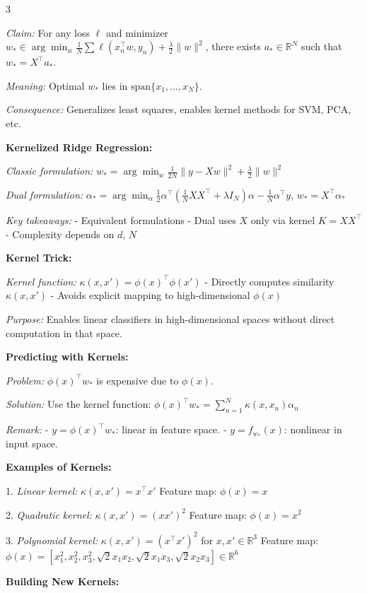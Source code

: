 \documentclass[landscape, 10pt]{article}
\begin{document}
\begin{multicols*}{3}
{\textit{Claim:} For any loss $\ell$ and minimizer  
$w_* \in \arg\min_w \frac{1}{N} \sum \ell(x_n^\top w, y_n) + \frac{\lambda}{2} \|w\|^2$,  
there exists $a_* \in \mathbb{R}^N$ such that $w_* = X^\top a_*$.

\textit{Meaning:} Optimal $w_*$ lies in $\text{span}\{x_1, \dots, x_N\}$.

\textit{Consequence:} Generalizes least squares, enables kernel methods for SVM, PCA, etc.
\item \textbf{Kernelized Ridge Regression:}

\textit{Classic formulation:}  
$w_* = \arg\min_w \frac{1}{2N} \|y - Xw\|^2 + \frac{\lambda}{2} \|w\|^2$

\textit{Dual formulation:}  
$\alpha_* = \arg\min_\alpha \frac{1}{2} \alpha^\top (\frac{1}{N} XX^\top + \lambda I_N) \alpha - \frac{1}{N} \alpha^\top y$,  
$w_* = X^\top \alpha_*$

\textit{Key takeaways:}  
- Equivalent formulations  
- Dual uses $X$ only via kernel $K = XX^\top$
- Complexity depends on $d$, $N$  

\item \textbf{Kernel Trick:}

\textit{Kernel function:} $\kappa(x, x') = \phi(x)^\top \phi(x')$  
- Directly computes similarity $\kappa(x, x')$  
- Avoids explicit mapping to high-dimensional $\phi(x)$  

\textit{Purpose:} Enables linear classifiers in high-dimensional spaces without direct computation in that space.  

\item \textbf{Predicting with Kernels:}

\textit{Problem:} $\phi(x)^\top w_*$ is expensive due to $\phi(x)$.  

\textit{Solution:} Use the kernel function:  
$\phi(x)^\top w_* = \sum_{n=1}^N \kappa(x, x_n) \alpha_n$  

\textit{Remark:}  
- $y = \phi(x)^\top w_*$: linear in feature space.  
- $y = f_{w_*}(x)$: nonlinear in input space.  

\item \textbf{Examples of Kernels:}

1. \textit{Linear kernel:} $\kappa(x, x') = x^\top x'$  
   Feature map: $\phi(x) = x$  

2. \textit{Quadratic kernel:} $\kappa(x, x') = (x x')^2$  
   Feature map: $\phi(x) = x^2$  

3. \textit{Polynomial kernel:} $\kappa(x, x') = (x^\top x')^2$ for $x, x' \in \mathbb{R}^3$  
   Feature map:  
   $\phi(x) = [x_1^2, x_2^2, x_3^2, \sqrt{2}x_1x_2, \sqrt{2}x_1x_3, \sqrt{2}x_2x_3] \in \mathbb{R}^6$  
\item \textbf{Building New Kernels:}

}
\end{multicols*}
\end{document}
